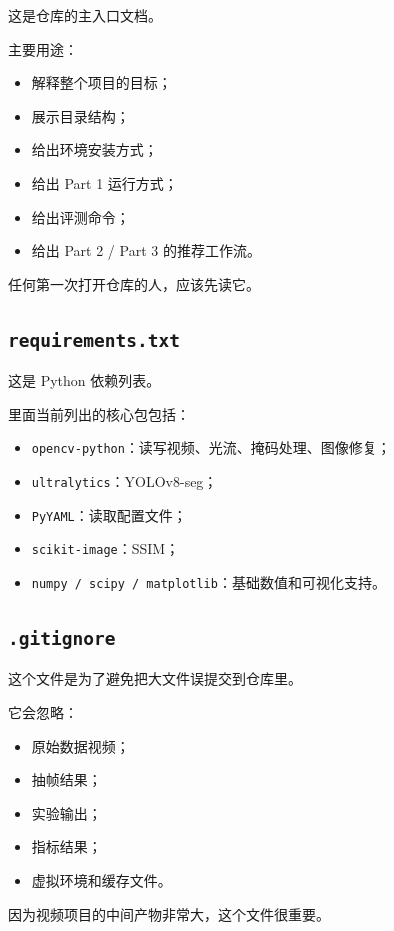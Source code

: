 \documentclass[11pt,a4paper,fontset=none]{ctexart}
\begin{document}
这是仓库的主入口文档。

主要用途：

\begin{itemize}
  \item 解释整个项目的目标；
  \item 展示目录结构；
  \item 给出环境安装方式；
  \item 给出 Part 1 运行方式；
  \item 给出评测命令；
  \item 给出 Part 2 / Part 3 的推荐工作流。
\end{itemize}

任何第一次打开仓库的人，应该先读它。

\subsection{\texttt{requirements.txt}}

这是 Python 依赖列表。

里面当前列出的核心包包括：

\begin{itemize}
  \item \texttt{opencv-python}：读写视频、光流、掩码处理、图像修复；
  \item \texttt{ultralytics}：YOLOv8-seg；
  \item \texttt{PyYAML}：读取配置文件；
  \item \texttt{scikit-image}：SSIM；
  \item \texttt{numpy / scipy / matplotlib}：基础数值和可视化支持。
\end{itemize}

\subsection{\texttt{.gitignore}}

这个文件是为了避免把大文件误提交到仓库里。

它会忽略：

\begin{itemize}
  \item 原始数据视频；
  \item 抽帧结果；
  \item 实验输出；
  \item 指标结果；
  \item 虚拟环境和缓存文件。
\end{itemize}

因为视频项目的中间产物非常大，这个文件很重要。
\end{document}
